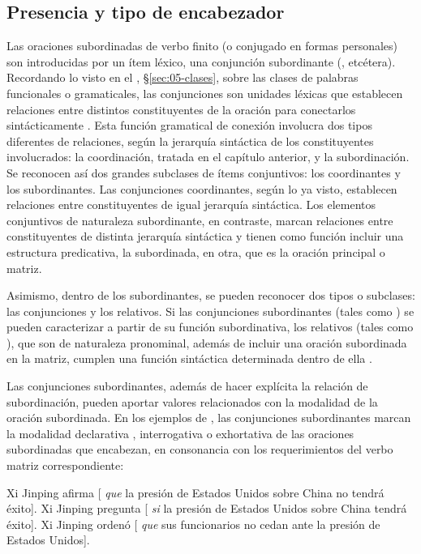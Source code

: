 \subsection{Presencia y tipo de encabezador}\label{sec:13-encabezador}

Las oraciones subordinadas de verbo finito (o conjugado en formas personales) son
introducidas por un ítem léxico, una conjunción subordinante (, etcétera). Recordando lo visto en el , §\ref{sec:05-clases}, sobre
las clases de palabras funcionales o gramaticales, las conjunciones son unidades
léxicas que establecen relaciones entre distintos constituyentes de la oración
para conectarlos sintácticamente \parencite{giammatteo2009}. Esta función
gramatical de conexión involucra dos tipos diferentes de relaciones, según la
jerarquía sintáctica de los constituyentes involucrados: la coordinación, tratada
en el capítulo anterior, y la subordinación. Se reconocen así dos grandes
subclases de ítems conjuntivos: los coordinantes y los subordinantes. Las
conjunciones coordinantes, según lo ya visto, establecen relaciones entre
constituyentes de igual jerarquía sintáctica. Los elementos conjuntivos de
naturaleza subordinante, en contraste, marcan relaciones entre constituyentes de
distinta jerarquía sintáctica y tienen como función incluir una estructura
predicativa, la subordinada, en otra, que es la oración principal o matriz.

Asimismo, dentro de los subordinantes, se pueden reconocer dos tipos o subclases:
las conjunciones y los relativos. Si las conjunciones subordinantes (tales como
) se pueden caracterizar a partir de su función
subordinativa, los relativos (tales como ), que son de naturaleza pronominal, además de
incluir una oración subordinada en la matriz, cumplen una función sintáctica
determinada dentro de ella \parencite{giammatteo2009}.

Las conjunciones subordinantes, además de hacer explícita la relación de
subordinación, pueden aportar valores relacionados con la modalidad de la oración
subordinada. En los ejemplos de , las conjunciones
subordinantes marcan la modalidad declarativa ,
interrogativa  o exhortativa 
de las oraciones subordinadas que encabezan, en consonancia con los
requerimientos del verbo matriz correspondiente:

\begin{exe}
  \ex\label{ex:13-modalidad}
    \begin{xlist}
      \ex\label{ex:13-modalidad-a} Xi Jinping afirma [ \textit{que} la
          presión de Estados Unidos sobre China no tendrá éxito].
      \ex\label{ex:13-modalidad-b} Xi Jinping pregunta [ \textit{si} la
          presión de Estados Unidos sobre China tendrá éxito].
      \ex\label{ex:13-modalidad-c} Xi Jinping ordenó [ \textit{que} sus
          funcionarios no cedan ante la presión de Estados Unidos].
    \end{xlist}
\end{exe}

